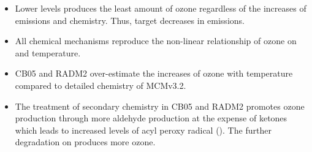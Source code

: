 \begin{BlueBox}
    \vskip-1cm
    \begin{block}{}
        \begin{itemize}
            \item Lower  levels produces the least amount of ozone regardless of the increases of emissions and chemistry. Thus, target decreases in  emissions.
            \item All chemical mechanisms reproduce the non-linear relationship of ozone on  and temperature.
            \item CB05 and RADM2 over-estimate the increases of ozone with temperature compared to detailed chemistry of MCMv3.2.
            \item The treatment of secondary chemistry in CB05 and RADM2 promotes ozone production through more aldehyde production at the expense of ketones which leads to increased levels of acyl peroxy radical (). The further degradation on  produces more ozone.
        \end{itemize}        
    \end{block}
\end{BlueBox}
